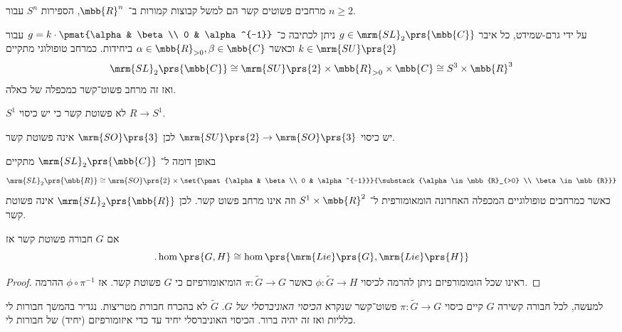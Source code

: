 \documentclass[10pt, twoside]{book}
\newcommand{\Lie}{\mrm{Lie}}
\begin{document}
\begin{example}
מרחבים פשוטים קשר הם למשל קבוצות קמורות ב־%
$\mbb{R}^n$,
הספירות
$S^n$
עבור
$n \geq 2$.
\end{example}

\begin{example}
על ידי גרם-שמידט, כל איבר
$g \in \mrm{SL}_2\prs{\mbb{C}}$
ניתן לכתיבה כ־%
$g = k \cdot \pmat{\alpha & \beta \\ 0 & \alpha^{-1}}$
עבור
$k \in \mrm{SU}\prs{2}$
וכאשר
$\alpha \in \mbb{R}_{>0}, \beta \in \mbb{C}$
ביחידות.
כמרחב טופולוגי מתקיים
\[\mrm{SL}_2\prs{\mbb{C}} \cong \mrm{SU}\prs{2} \times \mbb{R}_{>0} \times \mbb{C} \cong S^3 \times \mbb{R}^3\]
ואז זה מרחב פשוט־קשר כמכפלה של כאלה.
\end{example}

\begin{example}
$S^1$
לא פשוטת קשר כי יש כיסוי
$R \to S^1$.
\end{example}

\begin{example}
יש כיסוי
$\mrm{SU}\prs{2} \to \mrm{SO}\prs{3}$
לכן
$\mrm{SO}\prs{3}$
אינה פשוטת קשר.
\end{example}

\begin{example}
באופן דומה ל־%
$\mrm{SL}_2\prs{\mbb{C}}$
מתקיים
\[\mrm{SL}_2\prs{\mbb{R}} \cong \mrm{SO}\prs{2} \times \set{\pmat{\alpha & \beta \\ 0 & \alpha^{-1}}}{\substack{\alpha \in \mbb{R}_{>0} \\ \beta \in \mbb{R}}}\]
כאשר כמרחבים טופולוגיים המכפלה האחרונה הומאומורפית ל־%
$S^1 \times \mbb{R}^2$
וזה אינו מרחב פשוט קשר.
לכן
$\mrm{SL}_2\prs{\mbb{R}}$
אינה פשוטת קשר.
\end{example}

\begin{corollary}
אם
$G$
חבורה פשוטת קשר אז
\[\text{.} \hom\prs{G,H} \cong \hom\prs{\Lie\prs{G}, \Lie\prs{H}}\]
\end{corollary}

\begin{proof}
ראינו שכל הומומורפיזם ניתן להרמה לכיסוי
$\phi \colon \tilde{G} \to H$
כאשר
$\pi \colon \tilde{G} \to G$
הומיאומורפיזם כי
$G$
פשוטת קשר.
אז
$\phi \circ \pi^{-1}$
ההרמה.
\end{proof}

\begin{remark}
למעשה, לכל חבורה קשירה
$G$
קיים כיסוי
$\pi \colon \tilde{G} \to G$
פשוט־קשר שנקרא
\emph{הכיסוי האוניברסלי של
$G$}.
$\tilde{G}$
לא בהכרח חבורת מטריצות. נגדיר בהמשך חבורות לי כלליות ואז זה יהיה ברור.
הכיסוי האוניברסלי יחיד עד כדי איזומורפיזם (יחיד) של חבורות לי.
\end{remark}
\end{document}
